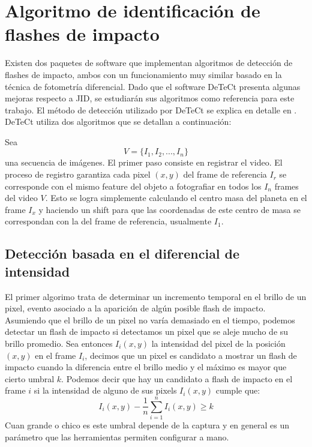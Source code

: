 \documentclass[a4paper,10pt]{article}
\begin{document}
\section{Algoritmo de identificación de flashes de impacto}
\label{sec-core}
Existen dos paquetes de software que implementan algoritmos de detección de flashes de 
impacto, ambos con un funcionamiento muy similar basado en la técnica de fotometría 
diferencial\cite{15}. Dado que el software DeTeCt\cite{16} presenta algunas mejoras 
respecto a JID\cite{17}\cite{18}, se estudiarán sus algoritmos como referencia para este 
trabajo. El método de detección utilizado por DeTeCt se explica en detalle en \cite{19}. 
DeTeCt utiliza dos algoritmos que se detallan a continuación:

Sea $$V = \{I_1, I_2, ... , I_n\}$$ una secuencia de imágenes. El primer paso consiste en 
registrar el video. El proceso de registro garantiza cada pixel $(x,y)$ del frame de 
referencia $I_r$ se corresponde con el mismo feature del objeto a fotografiar en todos 
los $I_n$ frames del video $V$. Esto se logra simplemente calculando el centro masa del 
planeta en el frame $I_x$ y haciendo un shift para que las coordenadas de este centro de 
masa se correspondan con la del frame de referencia, usualmente $I_1$.

\subsection{Detección basada en el diferencial de intensidad}
El primer algorimo trata de determinar un incremento temporal en el brillo de un pixel, 
evento asociado a la aparición de algún posible flash de impacto. Asumiendo que el 
brillo de un pixel no varía demasiado en el tiempo, podemos detectar un flash de 
impacto si detectamos un pixel que se aleje mucho de su brillo promedio.
Sea entonces $I_i(x,y)$ la intensidad del pixel de la posición $(x,y)$ en el frame $I_i$, 
decimos que un pixel es candidato a mostrar un flash de impacto cuando la diferencia 
entre el brillo medio y el máximo es mayor que cierto umbral $k$. Podemos decir que hay 
un candidato a flash de impacto en el frame $i$ si la intensidad de alguno de sus 
pixels $I_i(x,y)$ cumple que:
$$I_i(x,y) - \frac{1}{n}\sum_{i=1}^{n}I_i(x,y) \geq k$$
Cuan grande o chico es este umbral depende de la captura y en general es un parámetro que 
las herramientas permiten configurar a mano.
\end{document}
